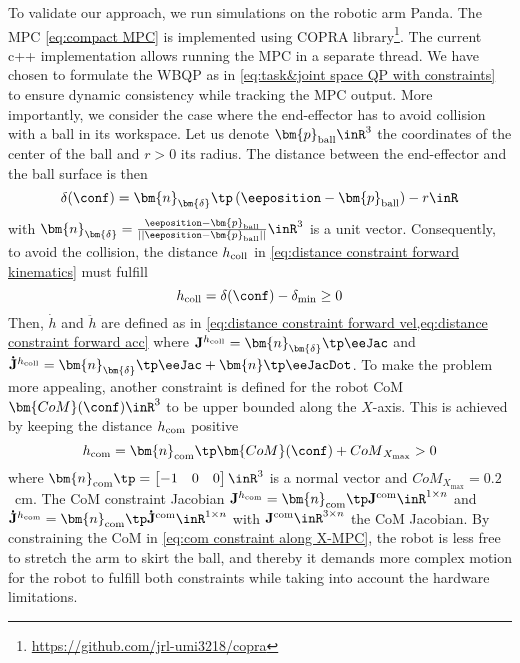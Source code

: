 To validate our approach, we run simulations on the robotic arm Panda. The MPC \cref{eq:compact MPC} is implemented using COPRA library\footnote{\url{https://github.com/jrl-umi3218/copra}}. The current c++ implementation allows running the MPC in a separate thread. 
We have chosen to formulate the WBQP as in \cref{eq:task&joint space QP with constraints} to ensure dynamic consistency while tracking the MPC output. %
More importantly, we consider the case where the end-effector has to avoid collision with a ball in its workspace. Let us denote $\bm{p}_{\rm ball}\inR^3$ the coordinates of the center of the ball and $r>0$ its radius. The distance between the end-effector and the ball surface is then 
\begin{equation}
	\delta(\conf) = \bm{n}_{\bm{\delta}}\tp\left(\eeposition - \bm{p}_{\rm ball}\right) - r \inR
\end{equation}
 with $\bm{n}_{\bm{\delta}}=\frac{\eeposition - \bm{p}_{\rm ball}}{||{\eeposition - \bm{p}_{\rm ball}}||}\inR^3$ is a unit vector. Consequently, to avoid the collision, the distance $h_{\rm coll}$ in \cref{eq:distance constraint forward kinematics} must fulfill
 \begin{equation}\label{eq:distance to collision constraint MPC}
 	h_{\rm coll}=\delta(\conf) - \delta_{\min} \geq0 
 \end{equation}
Then, $\dot{h}$ and $\ddot{h}$ are defined as in \cref{eq:distance constraint forward vel,eq:distance constraint forward acc} where $\mathbf{J}^{h_{\rm coll}}=\bm{n}_{\bm{\delta}}\tp\eeJac$ and $\mathbf{\dot{J}}^{h_{\rm coll}}=\bm{n}_{\bm{\delta}}\tp\eeJac + \bm{n}\tp\eeJacDot$. To make the problem more appealing, another constraint is defined for the robot CoM $\bm{CoM}(\conf)\inR^3$ to be upper bounded along the $X$-axis. This is achieved by keeping the distance $h_{\rm com}$ positive
\begin{equation}\label{eq:com constraint along X-MPC}
	h_{\rm com} = \bm{n}_{\rm com}\tp \bm{CoM}(\conf) + {CoM}_{X_{\max}} >0
\end{equation}
where $\bm{n}_{\rm com}\tp = \begin{bmatrix}
	-1 &0 &0
\end{bmatrix}\inR^3$ is a normal vector and ${CoM}_{X_{\max}}=0.2$~cm. The CoM constraint Jacobian $\mathbf{J}^{h_{\rm com}}=\bm{n}_{\rm com}\tp\mathbf{J}^{{\rm com}}\inR^{1\times n}$ and $\mathbf{\dot{J}}^{h_{\rm com}}=\bm{n}_{\rm com}\tp\mathbf{\dot{J}}^{{\rm com}}\inR^{1\times n}$ with $\mathbf{J}^{{\rm com}}\inR^{3\times n}$ the CoM Jacobian.
By constraining the CoM in \cref{eq:com constraint along X-MPC}, the robot is less free to stretch the arm to skirt the ball, and thereby it demands more complex motion for the robot to fulfill both constraints while taking into account the hardware limitations.   
 

